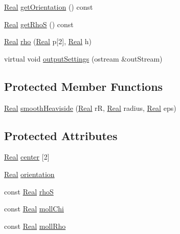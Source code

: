 \begin{DoxyCompactItemize}
\item 
\hyperlink{_h_d_f5_dumper_8h_a445a5f0e2a34c9d97d69a3c2d1957907}{Real} \hyperlink{class_shape_ae79a82f1fa1a88c95927f02f8664f843}{get\+Orientation} () const 
\item 
\hyperlink{_h_d_f5_dumper_8h_a445a5f0e2a34c9d97d69a3c2d1957907}{Real} \hyperlink{class_shape_a8ce0a2058afdaf2644c84b8d065d5edf}{get\+Rho\+S} () const 
\item 
\hyperlink{_h_d_f5_dumper_8h_a445a5f0e2a34c9d97d69a3c2d1957907}{Real} \hyperlink{class_shape_af43ed0f7e4b90ba50be1c9ea05451353}{rho} (\hyperlink{_h_d_f5_dumper_8h_a445a5f0e2a34c9d97d69a3c2d1957907}{Real} p\mbox{[}2\mbox{]}, \hyperlink{_h_d_f5_dumper_8h_a445a5f0e2a34c9d97d69a3c2d1957907}{Real} h)
\item 
virtual void \hyperlink{class_shape_ad01448fd3ab6d48e7b6d72ef2fa0822a}{output\+Settings} (ostream \&out\+Stream)
\end{DoxyCompactItemize}
\subsection*{Protected Member Functions}
\begin{DoxyCompactItemize}
\item 
\hyperlink{_h_d_f5_dumper_8h_a445a5f0e2a34c9d97d69a3c2d1957907}{Real} \hyperlink{class_shape_acbce5e61869b11226e3a45090387c7e9}{smooth\+Heaviside} (\hyperlink{_h_d_f5_dumper_8h_a445a5f0e2a34c9d97d69a3c2d1957907}{Real} r\+R, \hyperlink{_h_d_f5_dumper_8h_a445a5f0e2a34c9d97d69a3c2d1957907}{Real} radius, \hyperlink{_h_d_f5_dumper_8h_a445a5f0e2a34c9d97d69a3c2d1957907}{Real} eps)
\end{DoxyCompactItemize}
\subsection*{Protected Attributes}
\begin{DoxyCompactItemize}
\item 
\hyperlink{_h_d_f5_dumper_8h_a445a5f0e2a34c9d97d69a3c2d1957907}{Real} \hyperlink{class_shape_a865a04fe67fc785b3cbb44806a214248}{center} \mbox{[}2\mbox{]}
\item 
\hyperlink{_h_d_f5_dumper_8h_a445a5f0e2a34c9d97d69a3c2d1957907}{Real} \hyperlink{class_shape_a1778439509ada1f3fa64472610221d19}{orientation}
\item 
const \hyperlink{_h_d_f5_dumper_8h_a445a5f0e2a34c9d97d69a3c2d1957907}{Real} \hyperlink{class_shape_a181acdc3063f20a15ba1807f7b6a5d10}{rho\+S}
\item 
const \hyperlink{_h_d_f5_dumper_8h_a445a5f0e2a34c9d97d69a3c2d1957907}{Real} \hyperlink{class_shape_ad7d270a8ffc4056d4990424dffdd0488}{moll\+Chi}
\item 
const \hyperlink{_h_d_f5_dumper_8h_a445a5f0e2a34c9d97d69a3c2d1957907}{Real} \hyperlink{class_shape_af5aa25175d49bc463fada7b11f2735e1}{moll\+Rho}
\end{DoxyCompactItemize}


